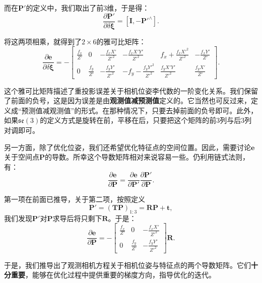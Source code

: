 而在$\bm{P}'$的定义中，我们取出了前3维，于是得：
\begin{equation}
\frac{{\partial \bm{P}'}}{{\partial \delta \boldsymbol{\xi} }} = \left[ { \bm{I}, - {\bm{P}'^ \wedge }} \right].
\end{equation}

将这两项相乘，就得到了$2 \times 6$的雅可比矩阵：
\begin{equation}
\label{eq:jacob-uv2xi}
\frac{{\partial \bm{e}}}{{\partial \delta \boldsymbol{\xi} }} = - \left[ {\begin{array}{*{20}{c}}
	{\frac{{{f_x}}}{Z'}}&0&{ - \frac{{{f_x}X'}}{{{Z'^2}}}}&{ - \frac{{{f_x}X'Y'}}{{{Z'^2}}}}&{{f_x} + \frac{{{f_x}{X'^2}}}{{{Z'^2}}}}&{ - \frac{{{f_x}Y'}}{Z'}}\\
	0&{\frac{{{f_y}}}{Z'}}&{ - \frac{{{f_y}Y'}}{{{Z'^2}}}}&{ - {f_y} - \frac{{{f_y}{Y'^2}}}{{{Z'^2}}}}&{\frac{{{f_y}X'Y'}}{{{Z'^2}}}}&{\frac{{{f_y}X'}}{Z'}}
	\end{array}} \right].
\end{equation}

这个雅可比矩阵描述了重投影误差关于相机位姿李代数的一阶变化关系。我们保留了前面的负号，这是因为误差是由\textbf{观测值减预测值}定义的。它当然也可反过来，定义成“预测值减观测值”的形式。在那种情况下，只要去掉前面的负号即可。此外，如果$\mathfrak{se}(3)$的定义方式是旋转在前，平移在后，只要把这个矩阵的前3列与后3列对调即可。

另一方面，除了优化位姿，我们还希望优化特征点的空间位置。因此，需要讨论$\bm{e}$关于空间点$\bm{P}$的导数。所幸这个导数矩阵相对来说容易一些。仍利用链式法则，有：
\begin{equation}
\frac{{\partial \bm{e}}}{{\partial \bm{P} }} = \frac{{\partial \bm{e}}}{{\partial \bm{P}'}}\frac{{\partial \bm{P}'}}{{\partial \bm{P} }}.
\end{equation}

第一项在前面已推导，关于第二项，按照定义
\[
\bm{P}'= (\bm{T} \bm{P})_{1:3} = \bm{R} \bm{P} + \bm{t},
\]
我们发现$\bm{P}'$对$\bm{P}$求导后将只剩下$\bm{R}$。于是：
\begin{equation}
\label{eq:jacob-uv2P}
\frac{{\partial \bm{e}}}{{\partial \bm{P} }} = -\left[ 
\begin{array}{*{20}{c}}
	\frac{f_x}{Z'} & 0 &- \frac{f_x X'}{Z'^2} \\
	0 & \frac{f_y}{Z'} & - \frac{f_y Y'}{Z'^2}
\end{array} \right] \bm{R}.
\end{equation}

于是，我们推导出了观测相机方程关于相机位姿与特征点的两个导数矩阵。它们\textbf{十分重要}，能够在优化过程中提供重要的梯度方向，指导优化的迭代。

